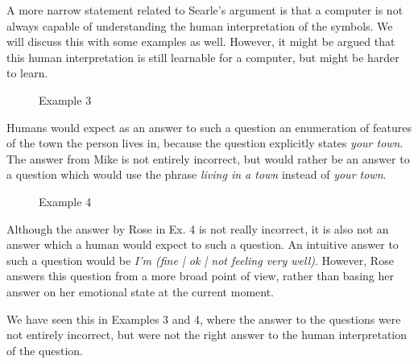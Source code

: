 A more narrow statement related to Searle's argument is that a computer is not always capable of understanding the human interpretation of the symbols. We will discuss this with some examples as well. However, it might be argued that this human interpretation is still learnable for a computer, but might be harder to learn.

\begin{figure}[ht]
   \begin{center}
   \end{center}
   \caption{Example 3}
\end{figure}

Humans would expect as an answer to such a question an enumeration of features of the town the person lives in, because the question explicitly states \textit{your town}. The answer from Mike is not entirely incorrect, but would rather be an answer to a question which would use the phrase \textit{living in a town} instead of \textit{your town}.

\begin{figure}[ht]
   \begin{center}
   \end{center}
   \caption{Example 4}
\end{figure}

Although the answer by Rose in Ex. 4 is not really incorrect, it is also not an answer which a human would expect to such a question. An intuitive answer to such a question would be \textit{I'm (fine | ok | not feeling very well)}. However, Rose answers this question from a more broad point of view, rather than basing her answer on her emotional state at the current moment.

We have seen this in Examples 3 and 4, where the answer to the questions were not entirely incorrect, but were not the right answer to the human interpretation of the question.

